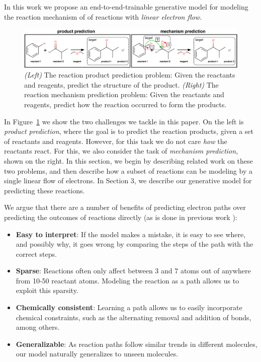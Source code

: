 In this work we propose an end-to-end-trainable generative model for modeling the reaction mechanism of of reactions with \emph{linear electron flow}.


\begin{figure}[t!]
\centering
\includegraphics[width=\textwidth]{reaction_diagram.pdf}
\caption{\emph{(Left)} The reaction product prediction problem: Given the reactants and reagents, predict the structure of the product. \emph{(Right)} The reaction mechanism prediction problem: Given the reactants and reagents, predict how the reaction occurred to form the products.}
\label{fig:task-overview}

\end{figure}
In Figure~\ref{fig:task-overview} we show the two challenges we tackle in this paper. 
On the left is \emph{product prediction}, where the goal is to predict the reaction products, given a set of reactants and reagents. However, for this task we do not care {\em how} the reactants react. For this, we also consider the task of \emph{mechanism prediction}, shown on the right. In this section, we begin by describing related work on these two problems, and then describe how a subset of reactions can be modeling by a single linear flow of electrons. In Section 3, we describe our generative model for predicting these reactions.



We argue that there are a number of benefits of predicting electron paths over predicting the outcomes of reactions directly (as is done in previous work \cite{jin2017predicting,schwaller2017found}):
\begin{itemize}
\item \textbf{Easy to interpret}: If the model makes a mistake, it is easy to see where, and possibly why, it goes wrong by comparing the steps of the path with the correct steps.
\item \textbf{Sparse}: Reactions often only affect between 3 and 7 atoms out of anywhere from 10-50 reactant atoms. Modeling the reaction as a path allows us to exploit this sparsity.
\item \textbf{Chemically consistent}: Learning a path allows us to easily incorporate chemical constraints, such as the alternating removal and addition of bonds, among others. 
\item \textbf{Generalizable}: As reaction paths follow similar trends in different molecules, our model naturally generalizes to unseen molecules. 
\end{itemize}





